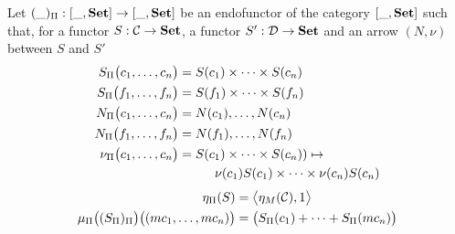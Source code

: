 




\begin{defn}
    Let $(\_)_\Pi : [\_, \bf Set] \rightarrow [\_,\bf Set]$ be an endofunctor of the category $ [\_, \bf Set] $ such that, for a functor $S : \mathcal{C} \rightarrow \bf Set$, a functor $S' : \mathcal{D} \rightarrow \bf Set$ and an arrow $(N,\nu)$ between $S$ and $S'$
    \begin{align*}
        S_\Pi\big(c_1,\dots,c_n\big)
         & = S(c_1)\times\dots\times S(c_n)           \\
        S_\Pi\big(f_1,\dots,f_n\big)
         & = S(f_1)\times\dots\times S(f_n)           \\
        N_\Pi\big(c_1,\dots,c_n\big)
         & = N(c_1),\dots, N(c_n)                     \\
        N_\Pi\big(f_1,\dots,f_n\big)
         & = N(f_1),\dots, N(f_n)                     \\
        \nu_\Pi\big(c_1,\dots,c_n\big)
         & = S(c_1)\times\dots\times S(c_n))  \mapsto \\
         & \hspace{1cm}
        \nu(c_1) S(c_1)\times\dots\times \nu(c_n) S(c_n)
    \end{align*}
    \begin{align*}
        \eta_\Pi(S)                                                       & = \big<\eta_M(\mathcal{C}),\mathrm{1}\big>             \\
        \mu_\Pi\big((S_\Pi)_\Pi\big)\big((mc_1,\dots,mc_n)\big) & =  \big(S_\Pi(c_1)+ \dots + S_\Pi(mc_n)\big) \\
    \end{align*}
\end{defn}

